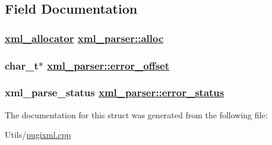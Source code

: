 \subsection{Field Documentation}
\hypertarget{structxml__parser_213cf019cbf45f5049acdcae296a2976}{
\subsubsection[alloc]{\setlength{\rightskip}{0pt plus 5cm}\hyperlink{structxml__allocator}{xml\_\-allocator} \hyperlink{structxml__parser_213cf019cbf45f5049acdcae296a2976}{xml\_\-parser::alloc}}}
\label{structxml__parser_213cf019cbf45f5049acdcae296a2976}


\hypertarget{structxml__parser_2476a71cd7e67b3f4bdbcd1323524503}{
\subsubsection[error\_\-offset]{\setlength{\rightskip}{0pt plus 5cm}char\_\-t$\ast$ \hyperlink{structxml__parser_2476a71cd7e67b3f4bdbcd1323524503}{xml\_\-parser::error\_\-offset}}}
\label{structxml__parser_2476a71cd7e67b3f4bdbcd1323524503}


\hypertarget{structxml__parser_0555859911674e5a7a349447d6533383}{
\subsubsection[error\_\-status]{\setlength{\rightskip}{0pt plus 5cm}xml\_\-parse\_\-status \hyperlink{structxml__parser_0555859911674e5a7a349447d6533383}{xml\_\-parser::error\_\-status}}}
\label{structxml__parser_0555859911674e5a7a349447d6533383}




The documentation for this struct was generated from the following file:\begin{CompactItemize}
\item 
Utils/\hyperlink{pugixml_8cpp}{pugixml.cpp}\end{CompactItemize}
